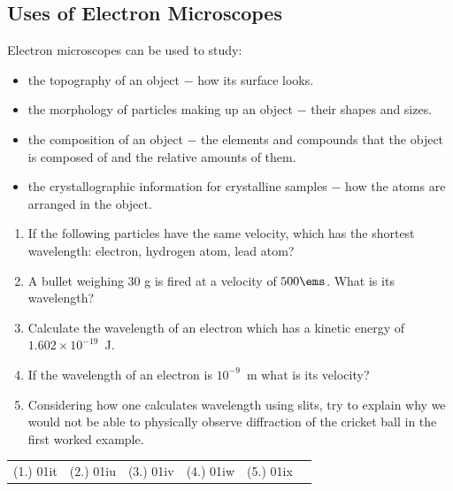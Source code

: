 \subsection{Uses of Electron Microscopes}
Electron microscopes can be used to study:
\begin{itemize}
\item the topography of an object $-$ how its surface looks.
\item the morphology of particles making up an object  $-$ their shapes and sizes.
\item the composition of an object $-$ the elements and compounds that the object is composed of and the relative amounts of them.
\item the crystallographic information for crystalline samples $-$ how the atoms are arranged in the object.
\end{itemize}



\begin{eocexercises}{}
\begin{enumerate}
  \item If the following particles have the same velocity, which has the shortest wavelength: electron, hydrogen atom, lead atom? 
\item A bullet weighing 30 g is fired at a velocity of $500\ems$. What is its wavelength?
\item Calculate the wavelength of an electron which has a kinetic energy of $1.602\times10^{-19}$~J.
\item If the wavelength of an electron is $10^{-9}$~m what is its velocity?
\item Considering how one calculates wavelength using slits, try to explain why we would not be able to physically observe diffraction of the cricket ball in the first worked example.
 \end{enumerate}
\par \practiceinfo
\par \begin{tabular}[h]{cccccc}
(1.)	01it	&
(2.)	01iu	&
(3.)	01iv	&
(4.)	01iw	&
(5.)	01ix	&
\end{tabular}
\end{eocexercises}






